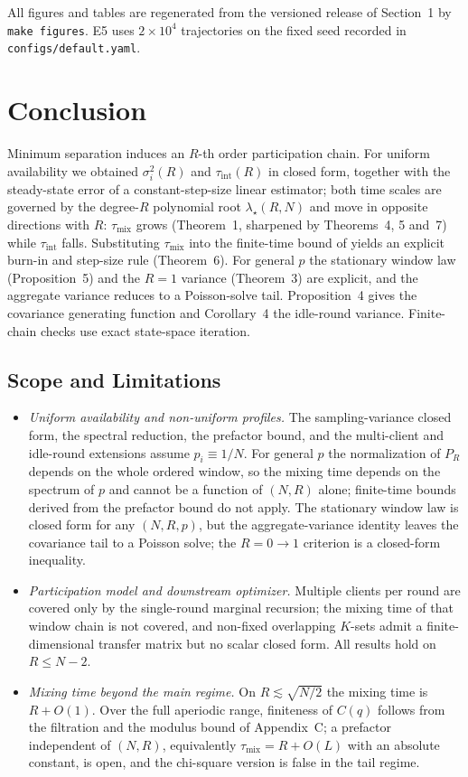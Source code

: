 \documentclass[twoside,11pt]{article}
\begin{document}
All figures and tables are regenerated from the versioned release of
Section~1 by \texttt{make figures}. E5 uses $2\times10^{4}$
trajectories on the fixed seed recorded in \texttt{configs/default.yaml}.
\label{sec:experiments}

\section{Conclusion}
Minimum separation induces an $R$-th order participation chain. For
uniform availability we obtained $\sigma_i^{2}(R)$ and
$\tau_{\mathrm{int}}(R)$ in closed form, together with the steady-state error
of a constant-step-size linear estimator; both time scales are governed by
the degree-$R$ polynomial root $\lambda_\star(R,N)$ and move in opposite
directions with $R$: $\tau_{\mathrm{mix}}$ grows (Theorem~1, sharpened by
Theorems~4, 5 and~7) while $\tau_{\mathrm{int}}$ falls. Substituting
$\tau_{\mathrm{mix}}$ into the finite-time bound of \citep{ref1} yields an
explicit burn-in and step-size rule (Theorem~6). For general $p$ the
stationary window law (Proposition~5) and the $R=1$ variance (Theorem~3) are
explicit, and the aggregate variance reduces to a Poisson-solve tail.
Proposition~4 gives the covariance generating function and Corollary~4 the
idle-round variance. Finite-chain checks use exact state-space iteration.

\subsection{Scope and Limitations}
\begin{itemize}
\item \emph{Uniform availability and non-uniform profiles.} The
sampling-variance closed form, the spectral reduction, the prefactor bound,
and the multi-client and idle-round extensions assume $p_i\equiv1/N$. For
general $p$ the normalization of $P_R$ depends on the whole ordered window,
so the mixing time depends on the spectrum of $p$ and cannot be a function of
$(N,R)$ alone; finite-time bounds derived from the prefactor bound do not
apply. The stationary window law is closed form for any $(N,R,p)$, but the
aggregate-variance identity leaves the covariance tail to a Poisson solve;
the $R=0\to1$ criterion is a closed-form inequality.

\item \emph{Participation model and downstream optimizer.} Multiple clients
per round are covered only by the single-round marginal recursion; the mixing
time of that window chain is not covered, and non-fixed overlapping $K$-sets
admit a finite-dimensional transfer matrix but no scalar closed form.
All results hold on $R\le N-2$.

\item \emph{Mixing time beyond the main regime.} On $R\lesssim\sqrt{N/2}$
the mixing time is $R+O(1)$. Over the full aperiodic range, finiteness of
$C(q)$ follows from the filtration and the modulus bound of Appendix~C; a
prefactor independent of $(N,R)$, equivalently
$\tau_{\mathrm{mix}}=R+O(L)$ with an absolute constant, is open, and the
chi-square version is false in the tail regime.
\end{itemize}
\end{document}
